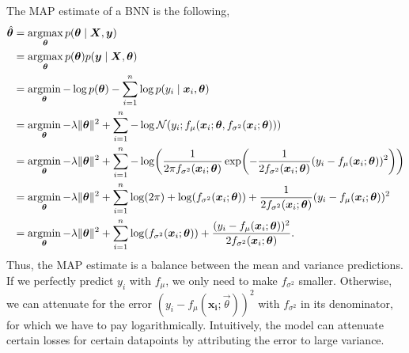 The MAP estimate of a BNN is the following,
\begin{align*}
    \hat{\vec{\theta}} & = \argmax_{\vec{\theta}} p(\vec{\theta}\mid\mat{X},\vec{y})                                                                                                                                                                                                 \\
                       & = \argmax_{\vec{\theta}} p(\vec{\theta}) p(\vec{y}\mid\mat{X},\vec{\theta})                                                                                                                                                                                 \\
                       & = \argmin_{\vec{\theta}} -\log p(\vec{\theta}) - \sum_{i=1}^n \log p(y_i\mid\vec{x}_i,\vec{\theta})                                                                                                                                                         \\
                       & = \argmin_{\vec{\theta}} -\lambda\lVert \vec{\theta} \rVert^2 + \sum_{i=1}^n -\log \mathcal{N}(y_i; f_\mu(\vec{x}_i;\vec{\theta}, f_{\sigma^2}(\vec{x}_i;\vec{\theta})))                                                                                    \\
                       & = \argmin_{\vec{\theta}} -\lambda\lVert \vec{\theta} \rVert^2 + \sum_{i=1}^n -\log \lft( \frac{1}{2\pi f_{\sigma^2}(\vec{x}_i;\vec{\theta})} \exp\lft( -\frac{1}{2f_{\sigma^2}(\vec{x}_i;\vec{\theta})} (y_i - f_\mu(\vec{x}_i;\vec{\theta}))^2 \rgt) \rgt) \\
                       & = \argmin_{\vec{\theta}} -\lambda\lVert \vec{\theta} \rVert^2 + \sum_{i=1}^n \log(2\pi) + \log(f_{\sigma^2}(\vec{x}_i;\vec{\theta})) + \frac{1}{2f_{\sigma^2}(\vec{x}_i;\vec{\theta})} (y_i - f_\mu(\vec{x}_i;\vec{\theta}))^2                              \\
                       & = \argmin_{\vec{\theta}} -\lambda\lVert \vec{\theta} \rVert^2 + \sum_{i=1}^n \log(f_{\sigma^2}(\vec{x}_i;\vec{\theta})) + \frac{(y_i - f_\mu(\vec{x}_i;\vec{\theta}))^2}{2f_{\sigma^2}(\vec{x}_i;\vec{\theta})}.
\end{align*}
Thus, the MAP estimate is a balance between the mean and variance
predictions. If we perfectly predict $y_i$ with $f_\mu$, we only need to make
$f_{\sigma^2}$ smaller. Otherwise, we can attenuate for the error
$(y_i-f_\mu(\bm{x_i};\vec{\theta}))^2$ with $f_{\sigma^2}$ in its denominator,
for which we have to pay logarithmically. Intuitively, the model can attenuate
certain losses for certain datapoints by attributing the error to large
variance.

